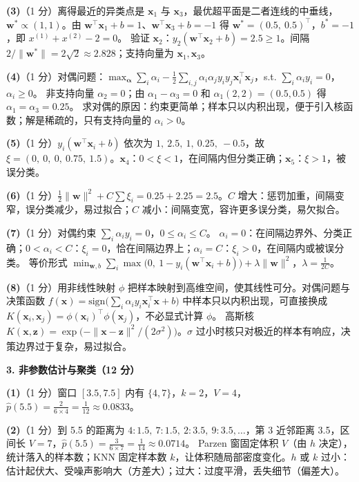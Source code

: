 \textbf{(3)}（1 分）离得最近的异类点是 $\bm x_1$ 与 $\bm x_3$，最优超平面是二者连线的中垂线，$\bm w^*\propto(1,1)$。由 $\bm w^\top\bm x_1+b=1$、$\bm w^\top\bm x_3+b=-1$ 得 $\bm w^*=(0.5,\ 0.5)^\top$，$b^*=-1$，即 $x^{(1)}+x^{(2)}-2=0$。
验证 $\bm x_2$：$y_2(\bm w^\top\bm x_2+b)=2.5\ge1$。间隔 $2/\|\bm w^*\|=2\sqrt2\approx2.828$；支持向量为 $\bm x_1,\bm x_3$。

\textbf{(4)}（1 分）对偶问题：$\max_{\bm\alpha}\sum_i\alpha_i-\frac12\sum_{i,j}\alpha_i\alpha_jy_iy_j\bm x_i^\top\bm x_j$，s.t. $\sum_i\alpha_iy_i=0$，$\alpha_i\ge0$。
非支持向量 $\alpha_2=0$；由 $\alpha_1-\alpha_3=0$ 和 $\alpha_1(2,2)=(0.5,0.5)$ 得 $\alpha_1=\alpha_3=0.25$。
求对偶的原因：约束更简单；样本只以内积出现，便于引入核函数；解是稀疏的，只有支持向量的 $\alpha_i>0$。

\textbf{(5)}（1 分）$y_i(\bm w^\top\bm x_i+b)$ 依次为 $1,\ 2.5,\ 1,\ 0.25,\ -0.5$，故 $\xi=(0,\ 0,\ 0,\ 0.75,\ 1.5)$。$\bm x_4$：$0<\xi<1$，在间隔内但分类正确；$\bm x_5$：$\xi>1$，被误分类。

\textbf{(6)}（1 分）$\frac12\|\bm w\|^2+C\sum\xi_i=0.25+2.25=2.5$。$C$ 增大：惩罚加重，间隔变窄，误分类减少，易过拟合；$C$ 减小：间隔变宽，容许更多误分类，易欠拟合。

\textbf{(7)}（1 分）对偶约束 $\sum_i\alpha_iy_i=0$，$0\le\alpha_i\le C$。
$\alpha_i=0$：在间隔边界外、分类正确；$0<\alpha_i<C$：$\xi_i=0$，恰在间隔边界上；$\alpha_i=C$：$\xi_i>0$，在间隔内或被误分类。
等价形式 $\min_{\bm w,b}\sum_i\max\big(0,\ 1-y_i(\bm w^\top\bm x_i+b)\big)+\lambda\|\bm w\|^2$，$\lambda=\frac1{2C}$。

\textbf{(8)}（1 分）用非线性映射 $\phi$ 把样本映射到高维空间，使其线性可分。对偶问题与决策函数 $f(\bm x)=\mathrm{sign}\big(\sum_i\alpha_iy_i\bm x_i^\top\bm x+b\big)$ 中样本只以内积出现，可直接换成 $K(\bm x_i,\bm x_j)=\phi(\bm x_i)^\top\phi(\bm x_j)$，不必显式计算 $\phi$。
高斯核 $K(\bm x,\bm z)=\exp\!\big(-\|\bm x-\bm z\|^2/(2\sigma^2)\big)$。$\sigma$ 过小时核只对极近的样本有响应，决策边界过于复杂，易过拟合。

\medskip
\noindent\textbf{3. 非参数估计与聚类（12 分）}

\textbf{(1)}（1 分）窗口 $[3.5,7.5]$ 内有 $\{4,7\}$，$k=2$，$V=4$，$\hat p(5.5)=\frac{2}{6\times4}=\frac1{12}\approx0.0833$。

\textbf{(2)}（1 分）到 5.5 的距离为 $4{:}1.5,\ 7{:}1.5,\ 2{:}3.5,\ 9{:}3.5,\dots$，第 3 近邻距离 3.5，区间长 $V=7$，$\hat p(5.5)=\frac{3}{6\times7}=\frac1{14}\approx0.0714$。
Parzen 窗固定体积 $V$（由 $h$ 决定），统计落入的样本数；KNN 固定样本数 $k$，让体积随局部密度变化。$h$ 或 $k$ 过小：估计起伏大、受噪声影响大（方差大）；过大：过度平滑，丢失细节（偏差大）。

